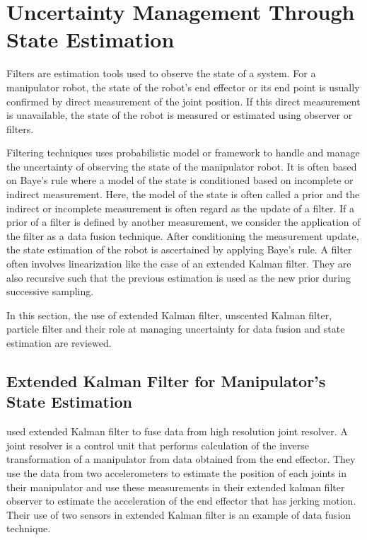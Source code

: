 \iffalse
The latter sections study the probabilistic approach 
at managing motion planning and the publications
that pioneered
it. The discussion of random sampling are further explained
as the probabilistic approach to planning algorithms
by referencing current research on sampling-based planners.
\fi
\section{Uncertainty Management Through State Estimation}\label{sec:uncertainty_state_estimation}
Filters are estimation tools used to observe the state of a system. 
For a manipulator robot, the state of the robot’s end effector or its end 
point is usually confirmed by direct measurement of the joint position. If this 
direct measurement is unavailable, the state of the robot is measured or estimated 
using observer or filters. 

Filtering techniques uses probabilistic model or framework to handle and manage the 
uncertainty of observing the state of the manipulator robot. It is often based on 
Baye’s rule where a model of the state is conditioned based on incomplete or indirect measurement. 
Here, the model of the state is often called a prior and the indirect or 
incomplete measurement is often regard as the update of a filter. 
If a prior of a filter is defined by another measurement, 
we consider the application of the filter as a data fusion technique. 
After conditioning the measurement update, the state estimation of 
the robot is ascertained by applying Baye’s rule. 
A filter often involves linearization like the case of an extended Kalman 
filter. 
They are also recursive such that the previous estimation 
is used as the new prior during successive sampling.

In this section, the use of extended Kalman filter, 
unscented Kalman filter, particle filter and their role 
at managing uncertainty for data fusion and state estimation 
are reviewed.

\subsection{Extended Kalman Filter for Manipulator's State Estimation}\label{sec:ekf_state_estimation}
\textcite{Jassemi-Zargani2002} used extended Kalman filter to fuse data 
from high resolution joint resolver. A joint resolver is a control unit 
that performs calculation of the inverse transformation of a manipulator 
from data obtained from the end effector. They use the data from two 
accelerometers to estimate the position of each joints in their manipulator 
and use these measurements in their extended kalman filter observer to 
estimate the acceleration of the end effector that has jerking motion. 
Their use of two sensors in extended Kalman filter 
is an example of data fusion technique.

